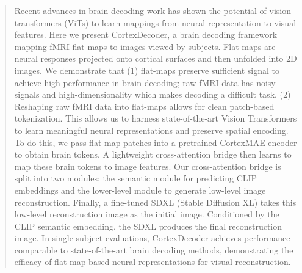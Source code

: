 \begin{abstract}
Recent advances in brain decoding work has shown the potential of vision transformers (ViTs) to learn mappings from neural representation to visual features. Here we present CortexDecoder, a brain decoding framework mapping fMRI flat-maps to images viewed by subjects. Flat-maps are neural responses projected onto cortical surfaces and then unfolded into 2D images. We demonstrate that (1) flat-maps preserve sufficient signal to achieve high performance in brain decoding; raw fMRI data has noisy signals and high-dimensionality which makes decoding a difficult task. (2) Reshaping raw fMRI data into flat-maps allows for clean patch-based tokenization. This allows us to harness state-of-the-art Vision Transformers to learn meaningful neural representations and preserve spatial encoding. To do this, we pass flat-map patches into a pretrained CortexMAE encoder to obtain brain tokens. A lightweight cross-attention bridge then learns to map these brain tokens to image features. Our cross-attention bridge is split into two modules; the semantic module for predicting CLIP embeddings and the lower-level module to generate low-level image reconstruction. Finally, a fine-tuned SDXL (Stable Diffusion XL) takes this low-level reconstruction image as the initial image. Conditioned by the CLIP semantic embedding, the SDXL produces the final reconstruction image. In single-subject evaluations, CortexDecoder achieves performance comparable to state-of-the-art brain decoding methods, demonstrating the efficacy of flat-map based neural representations for visual reconstruction.
\end{abstract}
